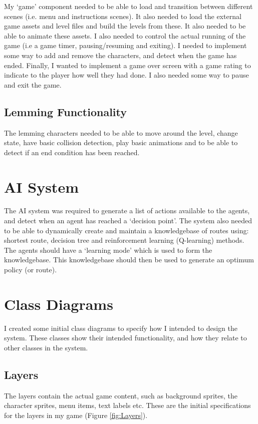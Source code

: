 \documentclass[a4paper,oneside]{report}
\begin{document}
My `game' component needed to be able to load and transition between different scenes (i.e. menu and instructions scenes). It also needed to load the external game assets and level files and build the levels from these. It also needed to be able to animate these assets. I also needed to control the actual running of the game (i.e a game timer, pausing/resuming and exiting). I needed to implement some way to add and remove the characters, and detect when the game has ended. Finally, I wanted to implement a game over screen with a game rating to indicate to the player how well they had done. I also needed some way to pause and exit the game.

\subsection{Lemming Functionality}

The lemming characters needed to be able to move around the level, change state, have basic collision detection, play basic animations and to be able to detect if an end condition has been reached.

\section{AI System}

The AI system was required to generate a list of actions available to the agents, and detect when an agent has reached a `decision point'. The system also needed to be able to dynamically create and maintain a knowledgebase of routes using: shortest route, decision tree and reinforcement learning (Q-learning) methods. The agents should have a `learning mode' which is used to form the knowledgebase. This knowledgebase should then be used to generate an optimum policy (or route).

\section{Class Diagrams}

I created some initial class diagrams to specify how I intended to design the system. These classes show their intended functionality, and how they relate to other classes in the system. 

\subsection{Layers}

The layers contain the actual game content, such as background sprites, the character sprites, menu items, text labels etc. These are the initial specifications for the layers in my game (Figure \ref{fig:Layers}).
\end{document}
